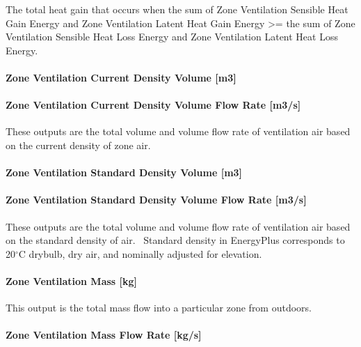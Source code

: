 The total heat gain that occurs when the sum of Zone Ventilation Sensible Heat Gain Energy and Zone Ventilation Latent Heat Gain Energy \textgreater{}= the sum of Zone Ventilation Sensible Heat Loss Energy and Zone Ventilation Latent Heat Loss Energy.

\paragraph{Zone Ventilation Current Density Volume {[}m3{]}}\label{zone-ventilation-current-density-volume-m3}

\paragraph{Zone Ventilation Current Density Volume Flow Rate {[}m3/s{]}}\label{zone-ventilation-current-density-volume-flow-rate-m3s}

These outputs are the total volume and volume flow rate of ventilation air based on the current density of zone air.

\paragraph{Zone Ventilation Standard Density Volume {[}m3{]}}\label{zone-ventilation-standard-density-volume-m3}

\paragraph{Zone Ventilation Standard Density Volume Flow Rate {[}m3/s{]}}\label{zone-ventilation-standard-density-volume-flow-rate-m3s}

These outputs are the total volume and volume flow rate of ventilation air based on the standard density of air.~ Standard density in EnergyPlus corresponds to 20$^\circ$C drybulb, dry air, and nominally adjusted for elevation.

\paragraph{Zone Ventilation Mass {[}kg{]}}\label{zone-ventilation-mass-kg}

This output is the total mass flow into a particular zone from outdoors.

\paragraph{Zone Ventilation Mass Flow Rate {[}kg/s{]}}\label{zone-ventilation-mass-flow-rate-kgs}

